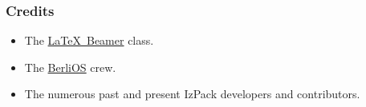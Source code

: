 \documentclass[compress,10pt]{beamer}
\begin{document}
\begin{frame}

\frametitle{Credits}

\begin{itemize}

  \item The \href{http://latex-beamer.sf.net/}{\LaTeX~Beamer} class.

  \item The \href{http://www.berlios.de/}{BerliOS} crew.

  \item The numerous past and present IzPack developers and contributors.

\end{itemize}

\end{frame}

\end{document}

